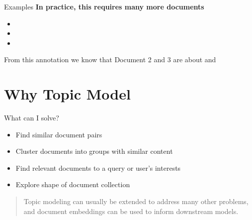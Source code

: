 \documentclass[10pt]{beamer}
\begin{document}
\begin{frame}{Examples}
{\bf In practice, this requires many more documents}

  \begin{multicols}{2}


    \vspace{.25em}


    \vspace{.25em}


    \columnbreak

    \begin{itemize}
    \item {}
    \item {}
    \item {}
    \end{itemize}

    \vspace{1em}

    From this annotation we know that Document 2 and 3 are about  and 
  \end{multicols}

\end{frame}

\section{Why Topic Model}
\begin{frame}{What can I solve?}
  \begin{itemize}
  \item Find similar document pairs
  \item Cluster documents into groups with similar content
  \item Find relevant documents to a query or user's interests
  \item Explore shape of document collection
  \end{itemize}

  \begin{quote}
    Topic modeling can usually be extended to address many other problems, and document embeddings can be used to inform downstream models.
  \end{quote}
\end{frame}
\end{document}
